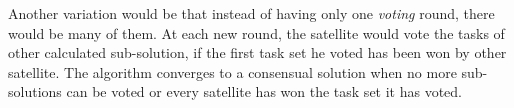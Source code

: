 Another variation would be that instead of having only one \emph{voting} round, there would be many of them. At each new round, the satellite would vote the tasks of other calculated sub-solution, if the first task set he voted has been won by other satellite. The algorithm converges to a consensual solution when no more sub-solutions can be voted or every satellite has won the task set it has voted.